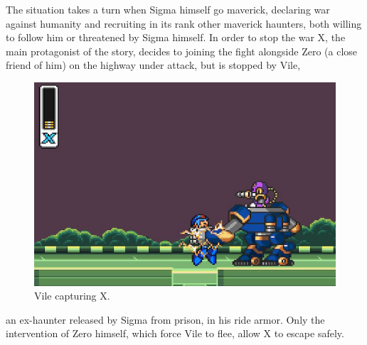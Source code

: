 The situation takes a turn when Sigma himself go maverick, declaring war against humanity and recruiting in its rank other maverick haunters, both willing to follow him or threatened by Sigma himself. In order to stop the war X, the main protagonist of the story, decides to joining the fight alongside Zero (a close friend of him) on the highway under attack, but is stopped by Vile,
\begin{figure}
	\centering
	\includegraphics[width=\linewidth]{figures/X1/Highway_screenshot_4.jpg}
	\caption{Vile capturing X.}
\end{figure} an ex-haunter released by Sigma from prison, in his ride armor. Only the intervention of Zero himself, which force Vile to flee, allow X to escape safely.

